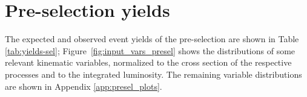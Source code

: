 \section{Pre-selection yields}

The expected and observed event yields of the pre-selection are shown in Table \ref{tab:yields-sel}; Figure~\ref{fig:input_vars_presel} shows the distributions of some relevant kinematic variables, normalized to the cross section of the respective processes and to the integrated luminosity. The remaining variable distributions are shown in Appendix \ref{app:presel_plots}. 

